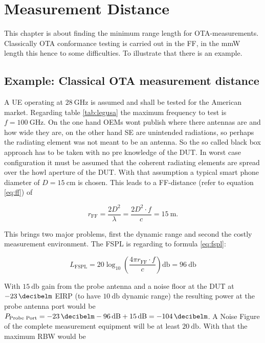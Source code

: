 \chapter{Measurement Distance}

This chapter is about finding the minimum range length for \ac{OTA}-measurements. Classically \ac{OTA} conformance testing is carried out in the \ac{FF}, in the \ac{mmW} length this hence to some difficulties. To illustrate that there is an example.

\section{Example: Classical OTA measurement distance}

A \ac{UE} operating at $\SI{28}{\giga\hertz}$ is assumed and shall be tested for the American market. Regarding table \ref{tab:legusa} the maximum frequency to test is $f = \SI{100}{\giga\hertz}$. On the one hand \acp{OEM} wont publish where there antennas are and how wide they are, on the other hand \ac{SE} are unintended radiations, so perhaps the radiating element was not meant to be an antenna. So the so called black box approach has to be taken with no pre knowledge of the \ac{DUT}. In worst case configuration it must be assumed that the coherent radiating elements are spread over the howl aperture of the \ac{DUT}. With that assumption a typical smart phone diameter of $D=\SI{15}{\centi\meter}$ is chosen. This leads to a \ac{FF}-distance (refer to equation \ref{eq:ff}) of 

\begin{equation}
r_{\text{FF}} = \frac{2D^2}{\lambda} = \frac{2D^2\cdot f}{c} = \SI{15}{\meter}.
\end{equation}

This brings two major problems, first the dynamic range and second the costly measurement environment. The \ac{FSPL} is regarding to formula \ref{eq:fspl}:

\begin{equation}
L_{\text{FSPL}} = 20\log_{10}\left(\frac{4\pi r_{\text{FF}} \cdot f}{c}\right)\si{\decibel} = \SI{96}{\decibel}
\end{equation}

With $\SI{15}{\decibel}$ gain from the probe antenna and a noise floor at the \ac{DUT} at $\SI{-23}{\decibelm}$ \ac{EIRP} (to have $\SI{10}{\decibel}$ dynamic range) the resulting power at the probe antenna port would be $P_{\text{Probe Port}} = \SI{-23}{\decibelm}-\SI{96}{\decibel}+\SI{15}{\decibel}=\SI{-104}{\decibelm}$. A Noise Figure of the complete measurement equipment will be at least $\SI{20}{\decibel}$. With that the maximum \ac{RBW} would be 

